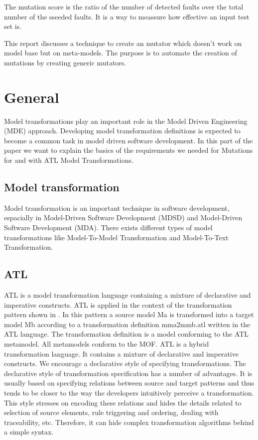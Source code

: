 \documentclass{llncs}
\begin{document}
The mutation score is the ratio of the number of detected faults over the total number of the sseeded faults. It is a way to meassure how effective an input test set is.\cite{mutationssurvey:yue}

This report discusses a technique to create an mutator which doesn't work on model base but on meta-models. The purpose is to automate the creation of mutations by creating generic mutators.

\section{General}

Model transformations play an important role in the Model Driven Engineering
(MDE) approach. Developing model transformation definitions is expected to
become a common task in model driven software development. \cite{atl:frederic}
In this part of the paper we want to explain the basics of the requirements we needed for Mutations for and with ATL Model Transformations.

\subsection{Model transformation}
Model transformation is an important technique in software development, espacially in Model-Driven Software Development (MDSD) and Model-Driven Software Development (MDA). There exists different types of model transformations like Model-To-Model Transformation and Model-To-Text Transformation.  

\subsection{ATL}
ATL is a model transformation language containing a mixture of declarative and
imperative constructs. ATL is applied in the context of the
transformation pattern shown in \label{fig:overview_atl}. In this pattern a source model Ma is transformed into a target model Mb according to a transformation definition mma2mmb.atl written in the ATL language. The transformation definition is a model conforming to the ATL metamodel. All metamodels conform to the MOF.
ATL is a hybrid transformation language. It contains a mixture of declarative
and imperative constructs. We encourage a declarative style of specifying transformations. The declarative style of transformation specification has a number of advantages. It is usually based on specifying relations between source and target patterns and thus tends to be closer to the way the developers intuitively perceive a transformation. This style stresses on encoding these relations and hides the details related to selection of source elements, rule triggering and ordering, dealing with traceability, etc. Therefore, it can hide complex transformation algorithms behind a simple syntax.\cite{atl:frederic}
\end{document}
